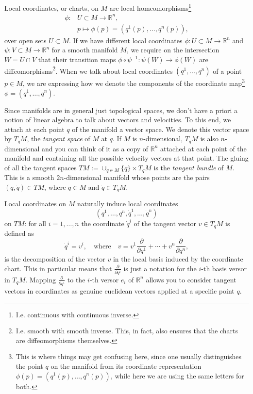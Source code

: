 \documentclass[english,fontsize=11pt,paper=a5,oneside]{scrbook}
\newcommand{\R}{\mathbb{R}}
\theoremstyle{definition}
\begin{document}
Local coordinates, or charts, on $M$ are local homeomorphisms\footnote{I.e. continuous with continuous inverse.}
\begin{align}
  \phi: & U\subset M\to \R^n, \\
        & p \mapsto \phi(p) = (q^1(p), \ldots, q^n(p)),
\end{align}
over open sets $U\subset M$. If we have different local coordinates $\phi:U\subset M\to\R^n$ and $\psi:V\subset M\to\R^n$ for a smooth manifold $M$, we require on the intersection $W=U\cap V$ that their transition maps $\phi\circ\psi^{-1}:\psi(W)\to\phi(W)$ are diffeomorphisms\footnote{I.e. smooth with smooth inverse. This, in fact, also ensures that the charts are diffeomorphisms themselves.}.
When we talk about local coordinates $(q^1,\ldots,q^n)$ of a point $p\in M$, we are expressing how we denote the components of the coordinate map\footnote{This is where things may get confusing here, since one usually distinguishes the point $q$ on the manifold from its coordinate representation $\phi(p)=(q^1(p), \ldots, q^n(p))$, while here we are using the same letters for both.} $\phi=(q^1, \ldots, q^n)$.

Since manifolds are in general just topological spaces, we don't have a priori a notion of linear algebra to talk about vectors and velocities.
To this end, we attach at each point $q$ of the manifold a vector space.
We denote this vector space by $T_q M$, the \emph{tangent space} of $M$ at $q$.
If $M$ is $n$-dimensional, $T_q M$ is also $n$-dimensional and you can think of it as a copy of $\R^n$ attached at each point of the manifold and containing all the possible velocity vectors at that point.
The gluing of all the tangent spaces $TM := \cup_{q\in M}\{q\}\times T_q M$ is the \emph{tangent bundle} of $M$. This is a smooth $2n$-dimensional manifold whose points are the pairs $(q,\dot q)\in TM$, where $q\in M$ and $\dot q\in T_q M$.

Local coordinates on $M$ naturally induce local coordinates \[(q^1,\ldots,q^n,\dot q^1, \ldots,\dot q^n)\] on $TM$: for all $i=1,\ldots,n$ the coordinate $\dot q^i$ of the tangent vector $v\in T_qM$ is defined as
\begin{equation}
  \dot q^i = v^i,\quad\mbox{where}\quad v = v^1\frac{\partial}{\partial q^1}+\cdots+v^n \frac{\partial}{\partial q^n},
\end{equation}
is the decomposition of the vector $v$ in the local basis induced by the coordinate chart.
This in particular means that $\frac{\partial}{\partial q^i}$ is just a notation for the $i$-th basis versor in $T_q M$.
Mapping $\frac{\partial}{\partial q^i}$ to the $i$-th versor $e_i$ of $\R^n$ allows you to consider tangent vectors in coordinates as genuine euclidean vectors applied at a specific point $q$.
\end{document}
